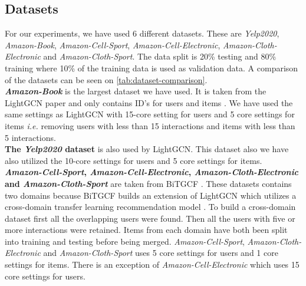 \subsection{Datasets}
For our experiments, we have used 6 different datasets.
These are \textit{Yelp2020}, \textit{Amazon-Book}, \textit{Amazon-Cell-Sport}, \textit{Amazon-Cell-Electronic}, \textit{Amazon-Cloth-Electronic} and \textit{Amazon-Cloth-Sport}.
The data split is 20\% testing and 80\% training where 10\% of the training data is used as validation data.
A comparison of the datasets can be seen on \autoref{tab:dataset-comparison}.
\\
\textbf{\textit{Amazon-Book}} is the largest dataset we have used.
It is taken from the LightGCN paper and only contains ID's for users and items \cite{lightgcn}.
We have used the same settings as LightGCN with 15-core setting for users and 5 core settings for items \textit{i.e.} removing users with less than 15 interactions and items with less than 5 interactions.
\\
\textbf{The \textit{Yelp2020} dataset} is also used by LightGCN.
This dataset also we have also utilized the 10-core settings for users and 5 core settings for items.
\\
\textbf{\textit{Amazon-Cell-Sport}, \textit{Amazon-Cell-Electronic}, \textit{Amazon-Cloth-Electronic} and \textit{Amazon-Cloth-Sport}} are taken from BiTGCF \cite{BiTGCF}.
These datasets contains two domains because BiTGCF builds an extension of LightGCN which utilizes a cross-domain transfer learning recommendation model \cite{BiTGCF}.
To build a cross-domain dataset first all the overlapping users were found.
Then all the users with five or more interactions were retained.
Items from each domain have both been split into training and testing before being merged.
\textit{Amazon-Cell-Sport}, \textit{Amazon-Cloth-Electronic} and \textit{Amazon-Cloth-Sport} uses 5 core settings for users and 1 core settings for items.
There is an exception of \textit{Amazon-Cell-Electronic} which uses 15 core settings for users.
